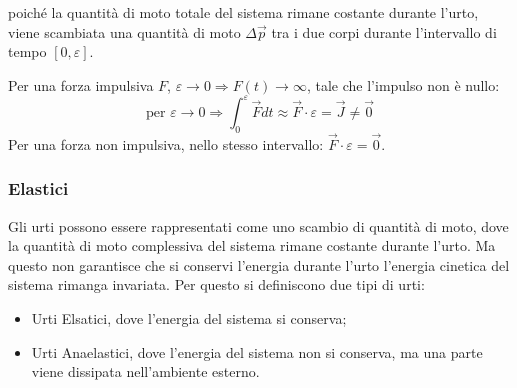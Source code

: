 \documentclass{article}
\numberwithin{equation}{subsection}
\begin{document}
poiché la quantità di moto totale del sistema rimane costante 
durante l'urto, viene scambiata una quantità di moto $\Delta\vec{p}$ 
tra i due corpi durante l'intervallo di tempo $[0,\varepsilon]$. 

Per una forza impulsiva $F$, $\varepsilon\to 0\Rightarrow F(t)\to \infty$, 
tale che l'impulso non è nullo:
\begin{equation}
    \mbox{per }\varepsilon\to 0\Rightarrow\displaystyle\int_{0}^{\varepsilon}\vec{F}dt\approx\vec{F}\cdot\varepsilon=\vec{J}\neq\vec{0}
\end{equation}
Per una forza non impulsiva, nello stesso intervallo: $\vec{F}\cdot\varepsilon=\vec{0}$. 

\begin{center}\end{center}

\subsubsection{Elastici}
Gli urti possono essere rappresentati come uno scambio di quantità 
di moto, dove la quantità di moto complessiva del sistema rimane 
costante durante l'urto. Ma questo non garantisce che si 
conservi l'energia durante l'urto l'energia cinetica del 
sistema rimanga invariata. Per questo si definiscono due tipi 
di urti:
\begin{itemize}
    \item Urti Elsatici, dove l'energia del sistema si conserva;
    \item Urti Anaelastici, dove l'energia del sistema non si conserva, ma una parte viene dissipata nell'ambiente esterno.
\end{itemize}
\end{document}
